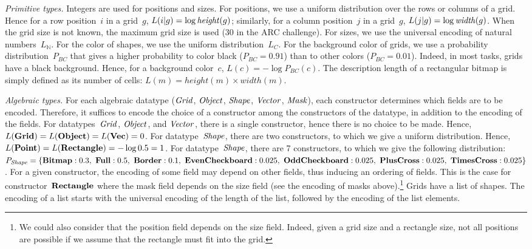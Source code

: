 \documentclass[a4paper]{llncs}
\newcommand{\KILL}[1]{}
\newcommand{\nat}{\mathbb{N}}
\begin{document}
{\em Primitive types.} Integers are used for positions and sizes. For
positions, we use a uniform distribution over the rows or columns of a
grid. Hence for a row position~$i$ in a grid~$g$,
$L(i|g) = \log {\it height}(g)$; similarly, for a column position~$j$
in a grid~$g$, $L(j|g) = \log {\it width}(g)$. When the grid size is
not known, the maximum grid size is used (30 in the ARC challenge).
%
For sizes, we use the universal encoding of natural numbers~$L_\nat$.
%
For the color of shapes, we use the uniform distribution~$L_C$. For
the background color of grids, we use a probability
distribution~$P_{BC}$ that gives a higher probability to color black
($P_{BC} = 0.91$) than to other colors ($P_{BC} = 0.01$). Indeed, in
most tasks, grids have a black background. Hence, for a background
color~$c$, $L(c) = -\log P_{BC}(c)$. \KILL{We then define the
  description length of background colors $L_{BC}(c)$ as
  $L_{P_{bc}}(c)$.}
%
The description length of a rectangular bitmap is simply defined as
its number of cells: $L(m) = height(m) \times width(m)$.

{\em Algebraic types.} For each algebraic datatype (${\it Grid}$,
${\it Object}$, ${\it Shape}$, ${\it Vector}$, ${\it Mask}$), each
constructor determines which fields are to be encoded. Therefore, it
suffices to encode the choice of a constructor among the constructors
of the datatype, in addition to the encoding of the fields. For
datatypes~${\it Grid}$, ${\it Object}$, and ${\it Vector}$, there is a
single constructor, hence there is no choice to be made. Hence,
$L({\bf Grid}) = L({\bf Object}) = L({\bf Vec}) = 0$. For
datatype~${\it Shape}$, there are two constructors, to which we give a
uniform distribution. Hence,
$L({\bf Point}) = L({\bf Rectangle}) = -\log 0.5 = 1$.  For
datatype~${\it Shape}$, there are 7 constructors, to which we give the
following distribution:
$P_{\it Shape} = \{ {\bf Bitmap}: 0.3,\ {\bf Full}: 0.5,\ {\bf Border}: 0.1,\ {\bf
  EvenCheckboard}: 0.025,\ {\bf OddCheckboard}: 0.025,\ {\bf PlusCross}:
0.025,\ {\bf TimesCross}: 0.025 \}$.
%
For a given constructor, the encoding of some field may depend on
other fields, thus inducing an ordering of fields. This is the case
for constructor~${\bf Rectangle}$ where the mask field depends on the
size field (see the encoding of masks above).\footnote{We could also consider
that the position field depends on the size field. Indeed, given a
grid size and a rectangle size, not all positions are possible if we
assume that the rectangle must fit into the grid.}
%
Grids have a list of shapes. The encoding of a list starts with the
universal encoding of the length of the list, followed by the encoding
of the list elements.
\end{document}
